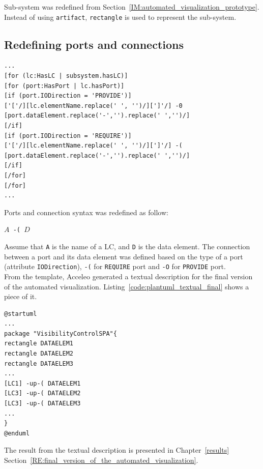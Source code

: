 Sub-system was redefined from Section~\ref{IM:automated_visualization_prototype}. Instead of using \texttt{artifact}, \texttt{rectangle} is used to represent the sub-system.

\subsection*{Redefining ports and connections}
\begin{lstlisting}[caption=Redefining ports and connection,label=code:redefining_ports_and_connection]
...
[for (lc:HasLC | subsystem.hasLC)]
[for (port:HasPort | lc.hasPort)] 
[if (port.IODirection = 'PROVIDE')] 
['['/][lc.elementName.replace(' ', '')/][']'/] -0 [port.dataElement.replace('-','').replace(' ','')/]
[/if]
[if (port.IODirection = 'REQUIRE')]
['['/][lc.elementName.replace(' ', '')/][']'/] -( [port.dataElement.replace('-','').replace(' ','')/]   
[/if]
[/for]
[/for]
...
\end{lstlisting}

Ports and connection syntax was redefined as follow:\\
\begin{center}
\texttt{$A$ -( $D$}
\end{center}
\vspace{1em}
Assume that \texttt{A} is the name of a LC, and \texttt{D} is the data element. The connection between a port and its data element was defined based on the type of a port (attribute \texttt{IODirection}), \texttt{-(} for \texttt{REQUIRE} port and \texttt{-O} for \texttt{PROVIDE} port. \\

From the template, Acceleo generated a textual description for the final version of the automated visualization. Listing~\ref{code:plantuml_textual_final} shows a piece of it.

\begin{lstlisting}[caption=A piece of textual representation generated from Acceleo template engine for the final version of the automated visualization,label=code:plantuml_textual_final]
@startuml
...
package "VisibilityControlSPA"{
rectangle DATAELEM1
rectangle DATAELEM2
rectangle DATAELEM3
...
[LC1] -up-( DATAELEM1     
[LC3] -up-( DATAELEM2     
[LC3] -up-( DATAELEM3
...
}
@enduml
\end{lstlisting}

The result from the textual description is presented in Chapter~\ref{results} Section~\ref{RE:final_version_of_the_automated_visualization}.

